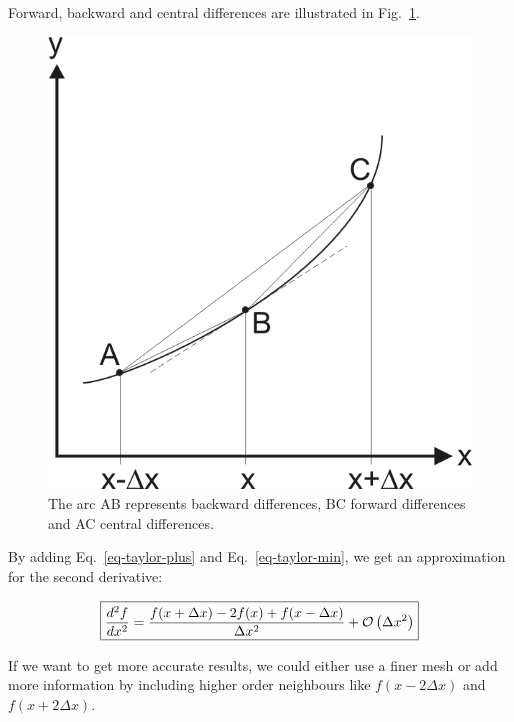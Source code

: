 Forward, backward and central differences are illustrated in Fig.~\ref{fig-fd}.

\begin{figure}
\centering
\includegraphics{numeric/figures/fd}
\caption{The arc AB represents backward differences, BC forward differences and AC central differences.}
\label{fig-fd}
\end{figure}

By adding Eq.~\ref{eq-taylor-plus} and Eq.~\ref{eq-taylor-min}, we get an approximation for the second derivative:

\begin{equation}
\fbox{$\displaystyle
\frac{d^2 f}{d x^2} = \frac{f(x + \Delta x) -2 f(x) + f(x- \Delta x)}{ \Delta x^2} + \mathcal{O}\left(\Delta x^2\right)
$}
\end{equation} 

If we want to get more accurate results, we could either use a finer mesh or add more information by including higher order neighbours like $f(x-2\Delta x)$ and $f(x+2\Delta x)$.

